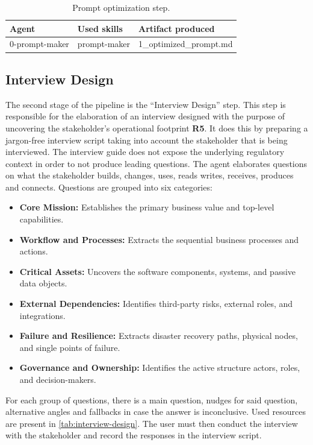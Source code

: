 \begin{table}[ht]
\centering
\begin{tabular}{lll}
\hline
\textbf{Agent} & \textbf{Used skills} & \textbf{Artifact produced} \\
\hline
0-prompt-maker & prompt-maker & 1\_optimized\_prompt.md \\
\hline
\end{tabular}
\caption{Prompt optimization step.}
\label{tab:prompt-optimization}
\end{table}

\subsection{Interview Design}

The second stage of the pipeline is the ``Interview Design'' step. This step is responsible for the elaboration of an interview designed with the purpose of uncovering the stakeholder's operational footprint \textbf{R5}. It does this by preparing a jargon-free interview script taking into account the stakeholder that is being interviewed. The interview guide does not expose the underlying regulatory context in order to not produce leading questions. The agent elaborates questions on what the stakeholder builds, changes, uses, reads writes, receives, produces and connects. Questions are grouped into six categories:

\begin{itemize}
    \item \textbf{Core Mission:} Establishes the primary business value and top-level capabilities.
    \item \textbf{Workflow and Processes:} Extracts the sequential business processes and actions.
    \item \textbf{Critical Assets:} Uncovers the software components, systems, and passive data objects.
    \item \textbf{External Dependencies:} Identifies third-party risks, external roles, and integrations.
    \item \textbf{Failure and Resilience:} Extracts disaster recovery paths, physical nodes, and single points of failure.
    \item \textbf{Governance and Ownership:} Identifies the active structure actors, roles, and decision-makers.
\end{itemize}

For each group of questions, there is a main question, nudges for said question, alternative angles and fallbacks in case the answer is inconclusive. Used resources are present in \ref{tab:interview-design}. The user must then conduct the interview with the stakeholder and record the responses in the interview script.

